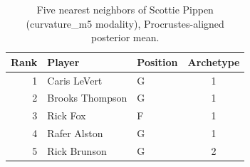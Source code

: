 \begin{table}[htbp]
  \centering\small
  \begin{tabular}{rllc}
    \toprule
    Rank & Player & Position & Archetype \\
    \midrule
    1 & Caris LeVert & G & 1 \\
    2 & Brooks Thompson & G & 1 \\
    3 & Rick Fox & F & 1 \\
    4 & Rafer Alston & G & 1 \\
    5 & Rick Brunson & G & 2 \\
    \bottomrule
  \end{tabular}
  \caption{Five nearest neighbors of Scottie Pippen (curvature_m5 modality), Procrustes-aligned posterior mean.}
  \label{tab:Scottie_Pippen_neighbors_curvature_m5}
\end{table}

